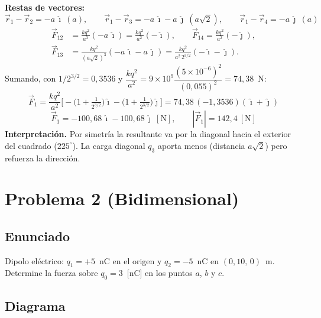 \documentclass[12pt,letterpaper]{article}
\begin{document}
\medskip
\noindent\textbf{Restas de vectores:}
\[
\vec r_1-\vec r_2 = -a\,\hat\imath\ (a),\qquad
\vec r_1-\vec r_3 = -a\,\hat\imath-a\,\hat\jmath\ (a\sqrt2),\qquad
\vec r_1-\vec r_4 = -a\,\hat\jmath\ (a)
\]
\begin{align*}
\vec F_{12} &= \frac{k q^2}{a^3}(-a\,\hat\imath) = \frac{k q^2}{a^2}(-\hat\imath),\qquad
\vec F_{14} = \frac{k q^2}{a^2}(-\hat\jmath),\\[2pt]
\vec F_{13} &= \frac{k q^2}{(a\sqrt2)^3}(-a\,\hat\imath-a\,\hat\jmath)
           = \frac{k q^2}{a^2\,2^{3/2}}(-\hat\imath-\hat\jmath).
\end{align*}
Sumando, con $1/2^{3/2}=0{,}3536$ y $\dfrac{k q^2}{a^2}=9\times10^9\dfrac{(5\times10^{-6})^2}{(0{,}055)^2}=74{,}38$~N:
\[
\vec F_1 = \frac{k q^2}{a^2}\Big[-\big(1+\tfrac{1}{2^{3/2}}\big)\hat\imath-\big(1+\tfrac{1}{2^{3/2}}\big)\hat\jmath\Big]
= 74{,}38\,(-1{,}3536)(\hat\imath+\hat\jmath)
\]
\[
\boxed{\vec F_1 = -100{,}68\,\hat\imath - 100{,}68\,\hat\jmath\ [\text{N}],\qquad |\vec F_1| = 142{,}4\ [\text{N}]}
\]
\noindent\textbf{Interpretaci\'on.} Por simetr\'ia la resultante va por la diagonal hacia el exterior del cuadrado ($225^\circ$). La carga diagonal $q_3$ aporta menos (distancia $a\sqrt2$) pero refuerza la direcci\'on.

\newpage
\section*{Problema 2 (Bidimensional)}

\subsection*{Enunciado}

Dipolo el\'ectrico: $q_1=+5$~nC en el origen y $q_2=-5$~nC en $(0{,}10,\,0)$~m. Determine la fuerza sobre $q_0=3$~[nC] en los puntos $a$, $b$ y $c$.

\subsection*{Diagrama}
\end{document}
